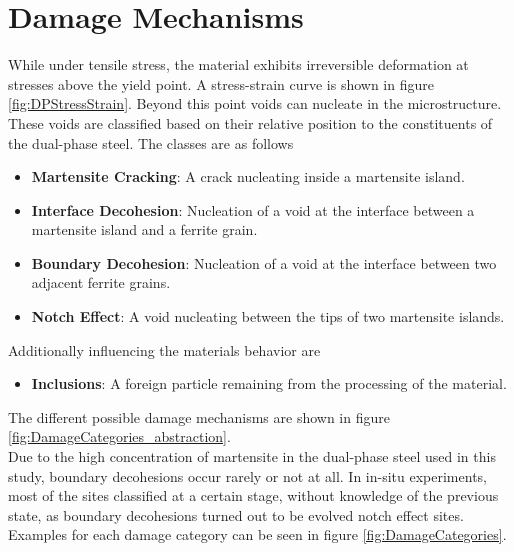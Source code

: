 \section{Damage Mechanisms}

While under tensile stress, the material exhibits irreversible deformation at stresses above the yield point. A stress-strain curve is shown in figure \ref{fig:DPStressStrain}. Beyond this point voids can nucleate in the microstructure. These voids are classified based on their relative position to the constituents of the dual-phase steel. The classes are as follows
\begin{itemize}[label={}]
\item \textbf{Martensite Cracking}: A crack nucleating inside a martensite island.
\item \textbf{Interface Decohesion}: Nucleation of a void at the interface between a martensite island and a ferrite grain.
\item \textbf{Boundary Decohesion}: Nucleation of a void at the interface between two adjacent ferrite grains.
\item \textbf{Notch Effect}: A void nucleating between the tips of two martensite islands. 
\end{itemize}
Additionally influencing the materials behavior are
\begin{itemize}[label={}]
\item \textbf{Inclusions}: A foreign particle remaining from the processing of the material. 
\end{itemize}
The different possible damage mechanisms are shown in figure \ref{fig:DamageCategories_abstraction}. \\
Due to the high concentration of martensite in the dual-phase steel used in this study, boundary decohesions occur rarely or not at all. In in-situ experiments, most of the sites classified at a certain stage, without knowledge of the previous state, as boundary decohesions turned out to be evolved notch effect sites. Examples for each damage category can be seen in figure \ref{fig:DamageCategories}.\\

